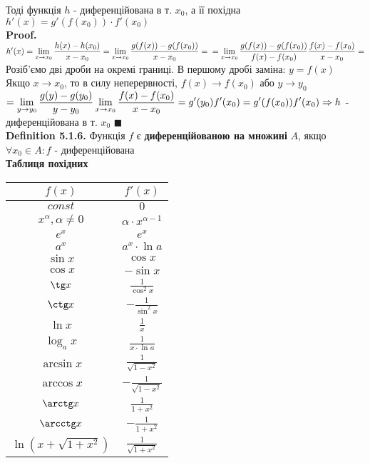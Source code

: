 \documentclass[a4paper, 14pt]{extarticle}
\def\huge{\displaystyle}
\def\bigline{\vspace{5mm}\\}
\def\defin#1{\textbf{Definition {#1}}}
\def\proof{\textbf{Proof.}\\}
\def\bigline{\vspace{5mm}\\}
\def\qed{$\blacksquare$}
\begin{document}
Тоді функція $h$ - диференційована в т. $x_0$, а її похідна\\
$h'(x) = g'(f(x_0)) \cdot f'(x_0)$\\
\proof
$h'(x) = \huge \lim_{x \to x_0} \frac{h(x)-h(x_0)}{x-x_0} = \lim_{x \to x_0} \frac{g(f(x))-g(f(x_0))}{x-x_0} = \\ = \lim_{x \to x_0} \frac{g(f(x))-g(f(x_0))}{f(x)-f(x_0)} \frac{f(x)-f(x_0)}{x-x_0} =$\\
Розіб'ємо дві дроби на окремі границі. В першому дробі заміна: $y=f(x)$\\
Якщо $x \to x_0$, то в силу неперервності, $f(x) \to f(x_0)$ або $y \to y_0$\\
$= \huge \lim_{y \to y_0} \frac{g(y)-g(y_0)}{y-y_0} \lim_{x \to x_0} \frac{f(x)-f(x_0)}{x-x_0}= g'(y_0) f'(x_0)=g'(f(x_0))f'(x_0) \\ \Rightarrow h$ - диференційована в т. $x_0$ \qed
\bigline
\defin{5.1.6.} Функція $f$ є \textbf{диференційованою на множині} $A$, якщо $\forall x_0 \in A: f$ - диференційована
\bigline
\textbf{Таблиця похідних}
\begin{center}
\begin{tabular}{ c|c } 
 $f(x)$ & $f'(x)$ \\
 \hline 
 $const$ & $0$ \\ [2ex]
 \hline 
 $x^\alpha, \alpha \neq 0$ & $\alpha \cdot x^{\alpha-1}$ \\ [2ex]
 \hline 
 $e^x$ & $e^x$ \\ [2ex]
 \hline 
 $a^x$ & $a^x \cdot \ln a$ \\ [2ex]
 \hline 
 $\sin x$ & $\cos x$\\ [2ex]
 \hline 
 $\cos x$ & $-\sin x$\\ [2ex]
 \hline 
 $\tg x$ & $\huge \frac{1}{\cos^2 x}$\\ [2ex]
 \hline 
 $\ctg x$ & $-\huge \frac{1}{\sin^2 x}$\\ [2ex]
 \hline 
 $\ln x$ & $\huge \frac{1}{x}$\\ [2ex]
 \hline 
 $\log_a x$ & $\huge \frac{1}{x \cdot \ln a}$\\ [2ex]
 \hline 
 $\arcsin x$ & $\huge \frac{1}{\sqrt{1-x^2}}$\\ [2ex]
 \hline 
 $\arccos x$ & $\huge -\frac{1}{\sqrt{1-x^2}}$\\ [2ex]
 \hline 
 $\arctg x$ & $\huge \frac{1}{1+x^2}$\\ [2ex]
 \hline 
 $\arcctg x$ & $\huge -\frac{1}{1+x^2}$\\ [2ex]
 \hline 
 $\ln(x+\sqrt{1+x^2})$ & $\huge \frac{1}{\sqrt{1+x^2}}$\\ [2ex]
 \hline 
\end{tabular}
\end{center}
\end{document}
